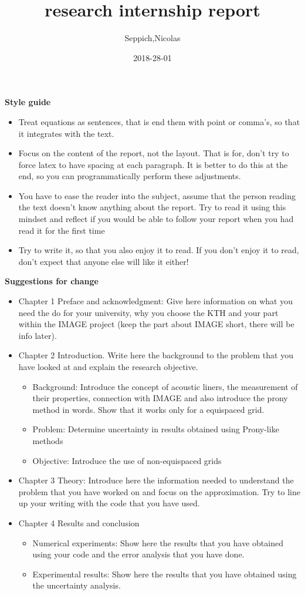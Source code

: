 \documentclass{article}
\title{research internship report}
\date{2018-28-01}
\author{Seppich,Nicolas}
\begin{document}
{\bf Style guide}
\begin{itemize}
\item Treat equations as sentences, that is end them with point or comma's, so that it integrates with the text.
\item Focus on the content of the report, not the layout. That is for, don't try to force latex to have spacing at each paragraph. It is better to do this at the end, so you can programmatically perform these adjustments.
\item You have to ease the reader into the subject, assume that the person reading the text doesn't know anything about the report. Try to read it using this mindset and reflect if you would be able to follow your report when you had read it for the first time
\item Try to write it, so that you also enjoy it to read. If you don't enjoy it to read, don't expect that anyone else will like it either!
\end{itemize}
{\bf Suggestions for change}
\begin{itemize}
    \item Chapter 1 Preface and acknowledgment: Give here information on what you need the do for your university, why you choose the KTH and your part within the IMAGE project (keep the part about IMAGE short, there will be info later).
    \item Chapter 2 Introduction. Write here the background to the problem that you have looked at and explain the research objective.
        \begin{itemize}
            \item Background: Introduce the concept of acoustic liners, the measurement of their properties, connection with IMAGE and also introduce the prony method in words. Show that it works only for a equispaced grid. 
            \item Problem: Determine uncertainty in results obtained using Prony-like methods
            \item Objective: Introduce the use of non-equispaced grids
        \end{itemize}
    \item Chapter 3 Theory: Introduce here the information needed to understand the problem that you have worked on and focus on the approximation. Try to line up your writing with the code that you have used.
    \item Chapter 4 Results and conclusion
        \begin{itemize}
            \item Numerical experiments: Show here the results that you have obtained using your code and the error analysis that you have done.
            \item Experimental results: Show here the results that you have obtained using the uncertainty analysis.
        \end{itemize}
\end{itemize}
\end{document}
